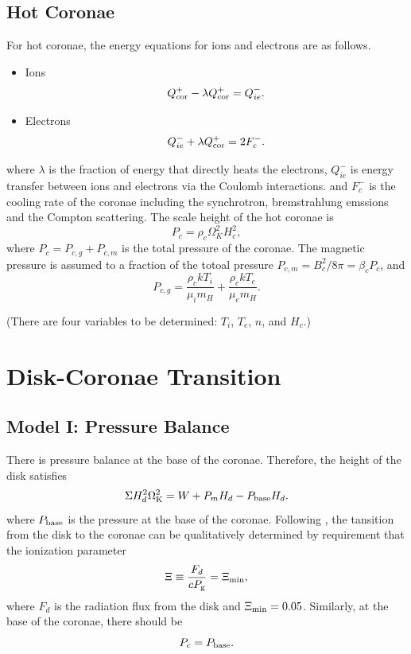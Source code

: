 \documentclass[oneside]{book}
\begin{document}
\subsection{Hot Coronae}
For hot coronae, the energy equations for ions and electrons are as follows.
\begin{itemize}
 \item Ions
 \begin{gather}
Q_{\rm cor}^+-\lambda Q_{\rm cor}^+=Q_{ie}^-.
\label{equ_cor_ions}
\end{gather}
 \item Electrons
 \begin{equation}
  Q_{ie}^-+\lambda Q_{\rm cor}^+=2F_c^-.
  \label{equ_cor_electrons}
 \end{equation}
\end{itemize}
where $\lambda$ is the fraction of energy that directly heats the electrons, $Q_{ie}^-$ is 
energy transfer between ions and electrons via the Coulomb interactions.
and $F_c^-$ is the cooling rate of the coronae including the synchrotron, bremstrahlung emssions and
the Compton scattering.
The scale height of the hot coronae is
\begin{equation}
P_c=\rho_c\Omega_K^2H_c^2,
\label{equ_cor_height}
\end{equation}
where $P_c=P_{c, g}+P_{c, m}$ is the total pressure of the coronae.  The magnetic pressure is assumed to a fraction
of the totoal pressure $P_{c, m}=B_c^2/8\pi=\beta_c P_c$, and 
\begin{equation}
P_{c, g}=\frac{\rho_ckT_i}{\mu_i m_H}+\frac{\rho_ckT_e}{\mu_e m_H}.
\end{equation}

(There are {\color{blue} four} variables to be determined: {\color{blue}$T_i$, $T_e$, $n$, and $H_c$}.)

\section{Disk-Coronae Transition}
\subsection{Model I: Pressure Balance}
There is pressure balance at the base of the coronae. Therefore, the height of the disk satisfies
\begin{equation}
\Sigma H_d^2\Omega_{\rm K}^2=W+P_mH_d-P_{\rm base}H_d.
\label{equ_disk_height}
\end{equation}
where $P_{\rm base}$ is the pressure at the base of the coronae.
Following \cite{Zycki1995}, the tansition from the disk to the coronae can be qualitatively determined by 
requirement that the ionization parameter
\begin{equation}
\Xi\equiv \frac{F_d}{cP_{\rm g}}=\Xi_{\rm min},
\end{equation}
where $F_d$ is the radiation flux from the disk and {\color{blue}$\Xi_{\rm min}=0.05$}.
Similarly, at the base of the coronae, there should be
\begin{equation}
P_c=P_{\rm base}.
\label{equ_cor_base}
\end{equation}
\end{document}
